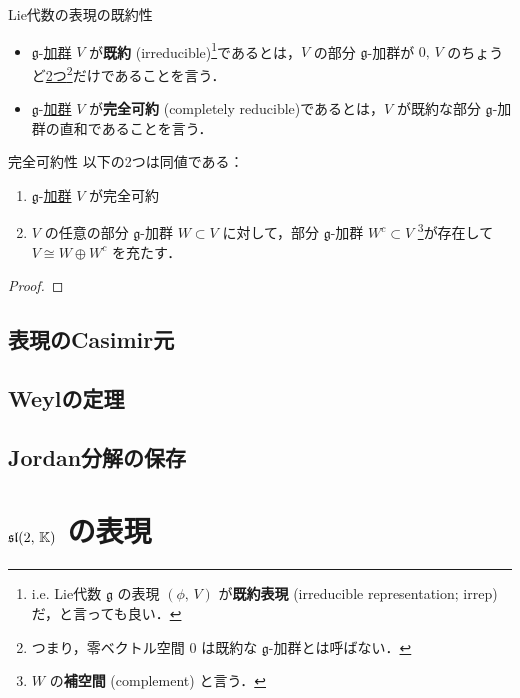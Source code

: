 \documentclass[rep_main]{subfiles}
\begin{document}
\begin{mydef}[label=def:irr]{Lie代数の表現の既約性}
    \begin{itemize}
		\item $\mathfrak{g}$-\hyperref[ax:g-module]{加群} $V$ が\textbf{既約} (irreducible)\footnote{i.e. Lie代数 $\mathfrak{g}$ の表現 $(\phi,\, V)$ が\textbf{既約表現} (irreducible representation; irrep) だ，と言っても良い．}であるとは，$V$ の部分 $\mathfrak{g}$-加群が $0,\, V$ のちょうど\underline{2つ}\footnote{つまり，零ベクトル空間 $0$ は既約な $\mathfrak{g}$-加群とは呼ばない．}だけであることを言う．
		\item $\mathfrak{g}$-\hyperref[ax:g-module]{加群} $V$ が\textbf{完全可約} (completely reducible)であるとは，$V$ が既約な部分 $\mathfrak{g}$-加群の直和であることを言う．
	\end{itemize}
	
\end{mydef}

\begin{myprop}[label=prop:reducible-1]{完全可約性}
	以下の2つは同値である：
	\begin{enumerate}
		\item $\mathfrak{g}$-\hyperref[ax:g-module]{加群} $V$ が完全可約
		\item $V$ の任意の部分 $\mathfrak{g}$-加群 $W \subset V$ に対して，部分 $\mathfrak{g}$-加群 $W^c \subset V$ \footnote{$W$ の\textbf{補空間} (complement) と言う．}が存在して $V \cong W \oplus W^c$ を充たす．
	\end{enumerate}
\end{myprop}

\begin{proof}
	
\end{proof}



\subsection{表現のCasimir元}
\subsection{Weylの定理}
\subsection{Jordan分解の保存}

\section{$\mathfrak{sl}(2,\, \mathbb{K})$ の表現}
\end{document}
